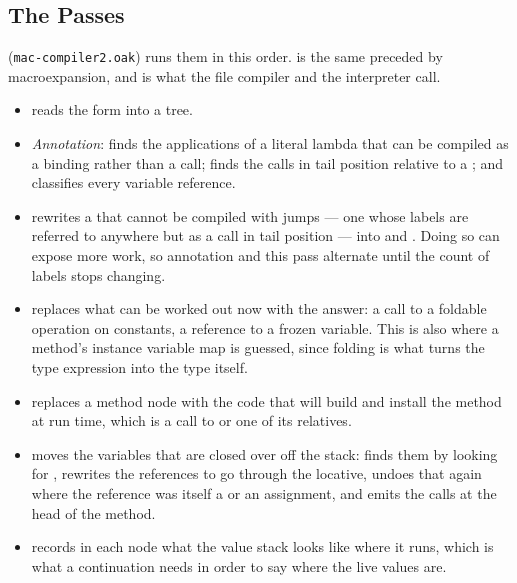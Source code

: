 \subsection{The Passes}

 (\texttt{mac-compiler2.oak}) runs them in this order.
 is the same preceded by macroexpansion, and is
what the file compiler and the interpreter call.

\begin{itemize}
\item {} reads the form into a tree.

\item \emph{Annotation}:  finds the
applications of a literal lambda that can be compiled as a binding
rather than a call;  finds the calls in tail
position relative to a ; and
 classifies every variable
reference.

\item {} rewrites a  that cannot be
compiled with jumps --- one whose labels are referred to anywhere but
as a call in tail position --- into  and .
Doing so can expose more work, so annotation and this pass alternate
until the count of labels stops changing.

\item {} replaces what can be worked out now with
the answer: a call to a foldable operation on constants, a reference
to a frozen variable.  This is also where a method's instance
variable map is guessed, since folding is what turns the type
expression into the type itself.

\item {} replaces a method node with the code
that will build and install the method at run time, which is a call
to  or one of its relatives.

\item {} moves the variables that are closed
over off the stack:  finds them by looking
for ,  rewrites the
references to go through the locative,  undoes
that again where the reference was itself a  or an
assignment, and  emits the
 calls at the head of the method.

\item {} records in each node what the value stack
looks like where it runs, which is what a continuation needs in
order to say where the live values are.
\end{itemize}

